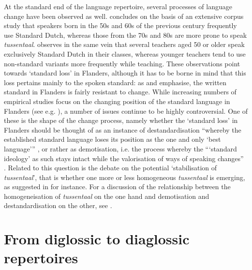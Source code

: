 \documentclass[output=paper]{LSP/langsci}
\begin{document}
At the standard end of the language repertoire, several processes of language change have been observed as well. \citet{plevoets_tussen_2008} concludes on the basis of an extensive corpus study that speakers born in the 50s and 60s of the previous century frequently use Standard Dutch, whereas those from the 70s and 80s are more prone to speak \textit{tussentaal}. \citet{delarue_teachers_2013} observes in the same vein that several teachers aged 50 or older speak exclusively Standard Dutch in their classes, whereas younger teachers tend to use non-standard variants more frequently while teaching. These observations point towards ‘standard loss’ in Flanders, although it has to be borne in mind that this loss pertains mainly to the spoken standard: as \citet[9]{grondelaers_standard_2011b} and \citet{vandekerckhove_belgian_2005} emphasise, the written standard in Flanders is fairly resistant to change. While increasing numbers of empirical studies focus on the changing position of the standard language in Flanders (see e.g. \citealt{plevoets_tussen_2008}), a number of issues continue to be highly controversial. One of these is the shape of the change process, namely whether the ‘standard loss’ in Flanders should be thought of as an instance of destandardisation “whereby the established standard language loses its position as the one and only ‘best language’” \citep[28]{coupland_slice:_2011}, or rather as demotisation, i.e. the process whereby the “‘standard ideology’ as such stays intact while the valorisation of ways of speaking changes” \citep[28]{coupland_slice:_2011}. Related to this question is the debate on the potential ‘stabilisation of \textit{tussentaal}’, that is whether one more or less homogeneous \textit{tussentaal} is emerging, as suggested in \citet{willemyns_verkavelingsbrabants._2005} for instance. For a discussion of the relationship between the homogeneisation of \textit{tussentaal} on the one hand and demotisation and destandardisation on the other, see \citet{ghyselen_stabilisering_forthcoming}.

\section{From diglossic to diaglossic repertoires}
\label{sec:ditodia}
\end{document}

